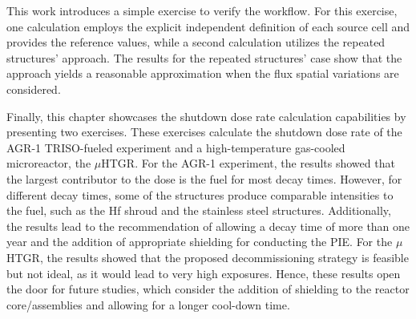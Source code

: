 This work introduces a simple exercise to verify the workflow.
For this exercise, one calculation employs the explicit independent definition of each source cell and provides the reference values, while a second calculation utilizes the repeated structures' approach.
The results for the repeated structures' case show that the approach yields a reasonable approximation when the flux spatial variations are considered.

Finally, this chapter showcases the shutdown dose rate calculation capabilities by presenting two exercises.
These exercises calculate the shutdown dose rate of the AGR-1 TRISO-fueled experiment and a high-temperature gas-cooled microreactor, the $\mu$HTGR.
For the AGR-1 experiment, the results showed that the largest contributor to the dose is the fuel for most decay times.
However, for different decay times, some of the structures produce comparable intensities to the fuel, such as the Hf shroud and the stainless steel structures.
Additionally, the results lead to the recommendation of allowing a decay time of more than one year and the addition of appropriate shielding for conducting the PIE.
For the $\mu$HTGR, the results showed that the proposed decommissioning strategy is feasible but not ideal, as it would lead to very high exposures.
Hence, these results open the door for future studies, which consider the addition of shielding to the reactor core/assemblies and allowing for a longer cool-down time.
